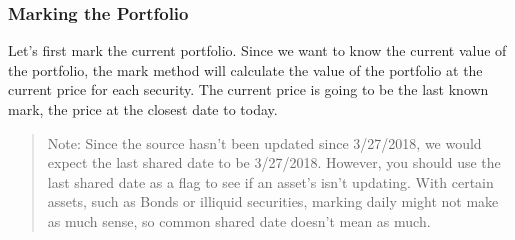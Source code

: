\documentclass[letterpaper,10pt,english]{sphinxmanual}
\begin{document}
\subsubsection{Marking the Portfolio}
\label{\detokenize{gettingstarted:marking-the-portfolio}}
\sphinxAtStartPar
Let’s first mark the current portfolio. Since we want to know the
current value of the portfolio, the mark method will calculate the value
of the portfolio at the current price for each security. The current
price is going to be the last known mark, the price at the closest date
to today.
\begin{quote}

\sphinxAtStartPar
Note: Since the  source hasn’t been updated since
3/27/2018, we would expect the last shared date to be 3/27/2018.
However, you should use the last shared date as a flag to see if an
asset’s  isn’t updating. With certain assets, such as
Bonds or illiquid securities, marking daily might not make as much
sense, so common shared date doesn’t mean as much.
\end{quote}

\begin{sphinxVerbatim}[commandchars=\\\{\}]
\end{sphinxVerbatim}
\end{document}
